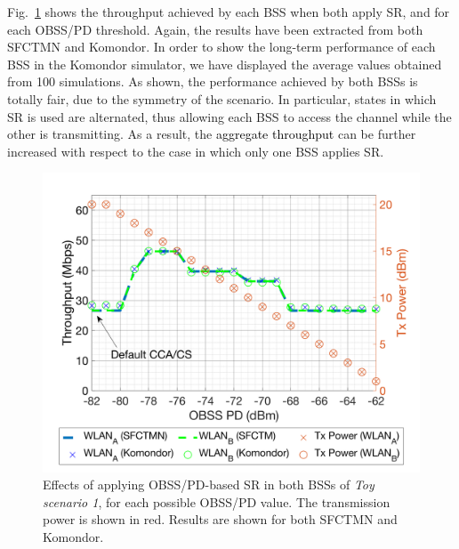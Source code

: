 \documentclass{ieeeaccess}
\begin{document}

Fig.~\ref{fig:toy_scenario_1c_results} shows the throughput achieved by each BSS when both apply SR, and for each OBSS/PD threshold. Again, the results have been extracted from both SFCTMN and Komondor. In order to show the long-term performance of each BSS in the Komondor simulator, we have displayed the average values obtained from 100 simulations. As shown, the performance achieved by both BSSs is totally fair, due to the symmetry of the scenario. In particular, states in which SR is used are alternated, thus allowing each BSS to access the channel while the other is transmitting. As a result, the \textcolor{black}{aggregate throughput} can be further increased with respect to the case in which only one BSS applies SR. %

\begin{figure}[ht!]
	\centering
	\includegraphics[width=\columnwidth]{SIM_1_1b}
	\caption{Effects of applying OBSS/PD-based SR in both BSSs of \emph{Toy scenario 1}, for each possible OBSS/PD value. The transmission power is shown in red. Results are shown for both SFCTMN and Komondor.}		
	\label{fig:toy_scenario_1c_results}
\end{figure}
\end{document}
